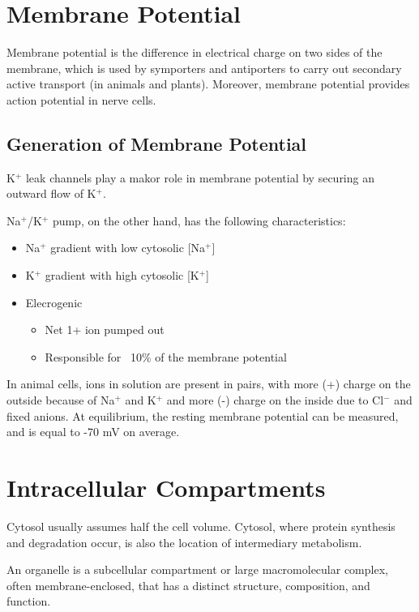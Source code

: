 \documentclass[11pt]{scrartcl}
\begin{document}
\section{Membrane Potential}

Membrane potential is the difference in electrical charge on two sides
of the membrane, which is used by symporters and antiporters to carry
out secondary active transport (in animals and plants). Moreover,
membrane potential provides action potential in nerve cells.

\subsection{Generation of Membrane Potential}

K$^+$ leak channels play a makor role in membrane potential by
securing an outward flow of K$^+$.

Na$^{+}$/K$^{+}$ pump, on the other hand, has the following characteristics:
\begin{itemize}
\item Na$^+$ gradient with low cytosolic [Na$^+$]
\item K$^+$ gradient with high cytosolic [K$^+$]
\item Elecrogenic

  \begin{itemize}
  \item Net 1+ ion pumped out
  \item Responsible for ~10\% of the membrane potential
  \end{itemize}

\end{itemize}

In animal cells, ions in solution are present in pairs, with more (+)
charge on the outside because of Na$^+$ and K$^+$ and more (-) charge
on the inside due to Cl$^-$ and fixed anions. At equilibrium, the
resting membrane potential can be measured, and is equal to -70 mV on
average.

\section{Intracellular Compartments}

Cytosol usually assumes half the cell volume. Cytosol, where protein
synthesis and degradation occur, is also the location of intermediary
metabolism.

\begin{definition}
  An organelle is a subcellular compartment or large macromolecular
  complex, often membrane-enclosed, that has a distinct structure,
  composition, and function.
\end{definition}
\end{document}
